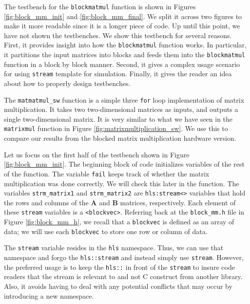 The testbench for the \lstinline{blockmatmul} function is shown in Figures \ref{fig:block_mm_init} and \ref{fig:block_mm_final}. We split it across two figures to make it more readable since it is a longer piece of code. Up until this point, we have not shown the testbenches. We show this testbench for several reasons. First, it provides insight into how the \lstinline{blockmatmul} function works. In particular, it partitions the input matrices into blocks and feeds them into the \lstinline{blockmatmul} function in a block by block manner. Second, it gives a complex usage scenario for using \lstinline{stream} template for simulation. Finally, it gives the reader an idea about how to properly design testbenches.

The \lstinline{matmatmul_sw} function is a simple three \lstinline{for} loop implementation of matrix multiplication. It takes two two-dimensional matrices as inputs, and outputs a single two-dimensional matrix. It is very similar to what we have seen in the \lstinline{matrixmul} function in Figure \ref{fig:matrixmultiplication_sw}. We use this to compare our results from the blocked matrix multiplication hardware version.

Let us focus on the first half of the testbench shown in Figure \ref{fig:block_mm_init}. The beginning block of code initializes variables of the rest of the function. The variable \lstinline{fail} keeps track of whether the matrix multiplication was done correctly. We will check this later in the function. The variables \lstinline{strm_matrix1} and \lstinline{strm_matrix2} are \lstinline{hls:stream<>} variables that hold the rows and columns of the $\mathbf{A}$ and $\mathbf{B}$ matrices, respectively. Each element of these \lstinline{stream} variables is a \lstinline{<blockvec>}. Referring back at the \lstinline{block_mm.h} file in Figure \ref{fig:block_mm_h}, we recall that a \lstinline{blockvec} is defined as an array of data; we will use each \lstinline{blockvec} to store one row or column of data. 

\begin{aside}
The \lstinline{stream} variable resides in the \lstinline{hls} namespace. Thus, we can use that namespace and forgo the \lstinline{hls::stream} and instead simply use \lstinline{stream}. However, the preferred usage is to keep the \lstinline{hls::} in front of the \lstinline{stream} to insure code readers that the stream is relevant to \VHLS and not C construct from another library. Also, it avoids having to deal with any potential conflicts that may occur by introducing a new namespace.
\end{aside}

